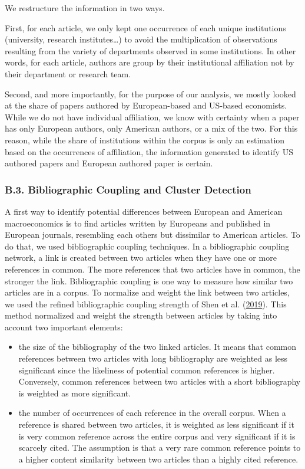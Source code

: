 \documentclass[]{elsarticle} %
\begin{document}
We restructure the information in two ways.

First, for each article, we only kept one occurrence of each unique
institutions (university, research institutes\ldots) to avoid the
multiplication of observations resulting from the variety of departments
observed in some institutions. In other words, for each article, authors
are group by their institutional affiliation not by their department or
research team.

Second, and more importantly, for the purpose of our analysis, we mostly
looked at the share of papers authored by European-based and US-based
economists. While we do not have individual affiliation, we know with
certainty when a paper has only European authors, only American authors,
or a mix of the two. For this reason, while the share of institutions
within the corpus is only an estimation based on the occurrences of
affiliation, the information generated to identify US authored papers
and European authored paper is certain.

\hypertarget{network}{%
\subsubsection*{B.3. Bibliographic Coupling and Cluster
Detection}\label{network}}

A first way to identify potential differences between European and
American macroeconomics is to find articles written by Europeans and
published in European journals, resembling each others but dissimilar to
American articles. To do that, we used bibliographic coupling
techniques. In a bibliographic coupling network, a link is created
between two articles when they have one or more references in common.
The more references that two articles have in common, the stronger the
link. Bibliographic coupling is one way to measure how similar two
articles are in a corpus. To normalize and weight the link between two
articles, we used the refined bibliographic coupling strength of Shen et
al. (\protect\hyperlink{ref-shen2019}{2019}). This method normalized and
weight the strength between articles by taking into account two
important elements:

\begin{itemize}
\item
  the size of the bibliography of the two linked articles. It means that
  common references between two articles with long bibliography are
  weighted as less significant since the likeliness of potential common
  references is higher. Conversely, common references between two
  articles with a short bibliography is weighted as more significant.
\item
  the number of occurrences of each reference in the overall corpus.
  When a reference is shared between two articles, it is weighted as
  less significant if it is very common reference across the entire
  corpus and very significant if it is scarcely cited. The assumption is
  that a very rare common reference points to a higher content
  similarity between two articles than a highly cited reference.
\end{itemize}
\end{document}
